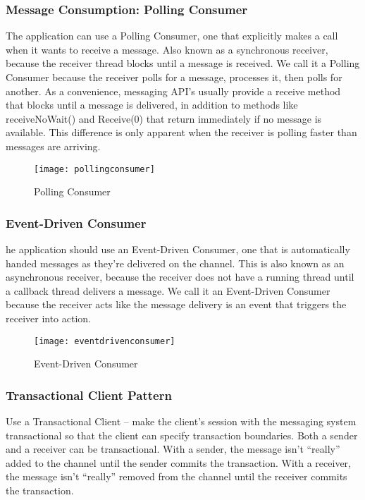 \subsubsection{Message Consumption: Polling Consumer}
The application can use a Polling Consumer, one that explicitly makes a call when it wants to receive a message. Also known as a synchronous receiver, because the receiver thread blocks until a message is received. We call it a Polling Consumer because the receiver polls for a message, processes it, then polls for another. As a convenience, messaging API’s usually provide a receive method that blocks until a message is delivered, in addition to methods like receiveNoWait() and Receive(0) that return immediately if no message is available. This difference is only apparent when the receiver is polling faster than messages are arriving.

\begin{figure}[H]
  \center
  \texttt{[image: pollingconsumer]}
  \caption{Polling Consumer}
\end{figure}

\subsubsection{Event-Driven Consumer}
he application should use an Event-Driven Consumer, one that is automatically handed messages as they’re delivered on the channel. This is also known as an asynchronous receiver, because the receiver does not have a running thread until a callback thread delivers a message. We call it an Event-Driven Consumer because the receiver acts like the message delivery is an event that triggers the receiver into action.

\begin{figure}[H]
  \center
  \texttt{[image: eventdrivenconsumer]}
  \caption{Event-Driven Consumer}
\end{figure}

\subsubsection{Transactional Client Pattern}
Use a Transactional Client – make the client’s session with the messaging system transactional so that the client can specify transaction boundaries. Both a sender and a receiver can be transactional. With a sender, the message isn’t “really” added to the channel until the sender commits the transaction. With a receiver, the message isn’t “really” removed from the channel until the receiver commits the transaction.

